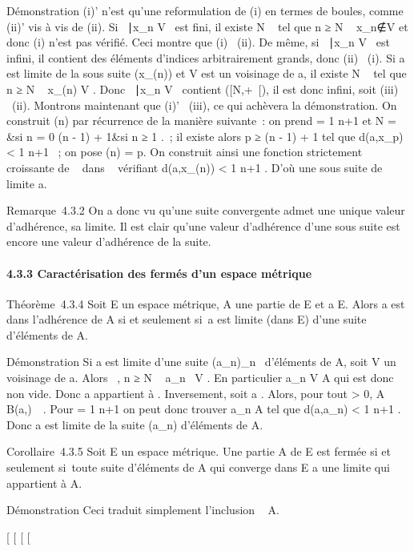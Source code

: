 \documentclass[]{article}
\begin{document}
Démonstration (i)' n'est qu'une reformulation de (i) en termes de
boules, comme (ii)' vis à vis de (ii). Si \n \in
{}~∣x_n \in V \ est
fini, il existe N \in {}~ tel que n ≥ N \rigtharrow~
x_n∉V et donc (i) n'est pas vérifié.
Ceci montre que (i) \rigtharrow~(ii). De même, si \n \in
{}~∣x_n \in V \ est
infini, il contient des éléments d'indices arbitrairement grands, donc
(ii) \rigtharrow~(i). Si a est limite de la sous suite (x_\phi(n)) et V est
un voisinage de a, il existe N \in {}~ tel que n ≥ N \rigtharrow~ x_\phi(n) \in V .
Donc \n \in {}~∣x_n \in V
\ contient \phi({[}N,+\infty~{[}), il est donc infini, soit
(iii) \rigtharrow~(ii). Montrons maintenant que (i)' \rigtharrow~(iii), ce qui achèvera la
démonstration. On construit \phi(n) par récurrence de la manière suivante~:
on prend \epsilon = 1 \over n+1 et N = \left
\  &si n = 0
\cr \phi(n - 1) + 1&si n ≥ 1 \cr 
\right .~; il existe alors p ≥ \phi(n - 1) + 1 tel que
d(a,x_p) \textless{} 1 \over n+1 ~; on pose
\phi(n) = p. On construit ainsi une fonction strictement croissante de ~
dans ~ vérifiant d(a,x_\phi(n)) \textless{} 1
\over n+1 . D'où une sous suite de limite a.

Remarque~4.3.2 On a donc vu qu'une suite convergente admet une unique
valeur d'adhérence, sa limite. Il est clair qu'une valeur d'adhérence
d'une sous suite est encore une valeur d'adhérence de la suite.

\paragraph{4.3.3 Caractérisation des fermés d'un espace métrique}

Théorème~4.3.4 Soit E un espace métrique, A une partie de E et a \in E.
Alors a est dans l'adhérence de A si et seulement si~a est limite (dans
E) d'une suite d'éléments de A.

Démonstration Si a est limite d'une suite (a_n)_n\in{}~
d'éléments de A, soit V un voisinage de a. Alors
\existsN \in {}~, n ≥ N \rigtharrow~ a_n~ \in V . En
particulier a_n \in V \bigcap A qui est donc non vide. Donc a
appartient à \overlineA. Inversement, soit a
\in\overlineA. Alors, pour tout \epsilon \textgreater{} 0, A \bigcap
B(a,\epsilon)\neq~\varnothing~. Pour \epsilon = 1 \over
n+1 on peut donc trouver a_n \in A tel que d(a,a_n)
\textless{} 1 \over n+1 . Donc a est limite de la
suite (a_n) d'éléments de A.

Corollaire~4.3.5 Soit E un espace métrique. Une partie A de E est fermée
si et seulement si~toute suite d'éléments de A qui converge dans E a une
limite qui appartient à A.

Démonstration Ceci traduit simplement l'inclusion
\overlineA \subset~ A.

{[}
{[}
{[}
{[}
\end{document}
